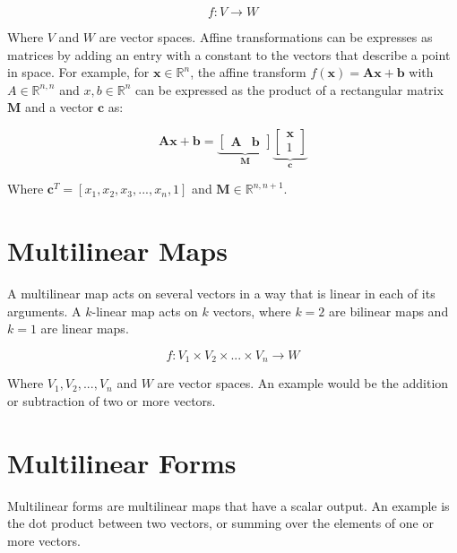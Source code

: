 \begin{equation}
f: V \rightarrow W
\end{equation}

Where $V$ and $W$ are vector spaces. Affine transformations can be expresses as matrices by adding an entry with a constant to the vectors that describe a point in space. For example, for $\mathbf{x} \in \mathbb{R}^n$,  the affine transform $f(\mathbf{x}) = \mathbf{A}\mathbf{x} + \mathbf{b}$ with $A\in\mathbb{R}^{n,n}$ and $x,b \in \mathbb{R}^{n}$ can be expressed as the product of a rectangular matrix $\mathbf{M}$ and a vector $\mathbf{c}$ as:

\begin{equation}
\mathbf{A}\mathbf{x} + \mathbf{b} = \underbrace{\left[\begin{array}{c|c} \mathbf{A} & \mathbf{b} \end{array}\right]}_{\mathbf{M}} \underbrace{\left[\begin{array}{c} \mathbf{x} \\ 1\end{array} \right]}_{\mathbf{c}}
\end{equation}

Where $\mathbf{c}^T = \left[x_1,x_2,x_3,...,x_n,1\right]$ and $\mathbf{M} \in \mathbb{R}^{n,n+1}$.

\section{Multilinear Maps}

A multilinear map acts on several vectors in a way that is linear in each of its arguments. A $k$-linear map acts on $k$ vectors, where $k=2$ are bilinear maps and $k=1$ are linear maps.

\begin{equation}	
f: V_1 \times V_2 \times ... \times V_n \rightarrow W
\end{equation}

Where $V_1, V_2, ... , V_n$ and $W$ are vector spaces. An example would be the addition or subtraction of two or more vectors.

\section{Multilinear Forms}
Multilinear forms are multilinear maps that have a scalar output. An example is the dot product between two vectors, or summing over the elements of one or more vectors.

